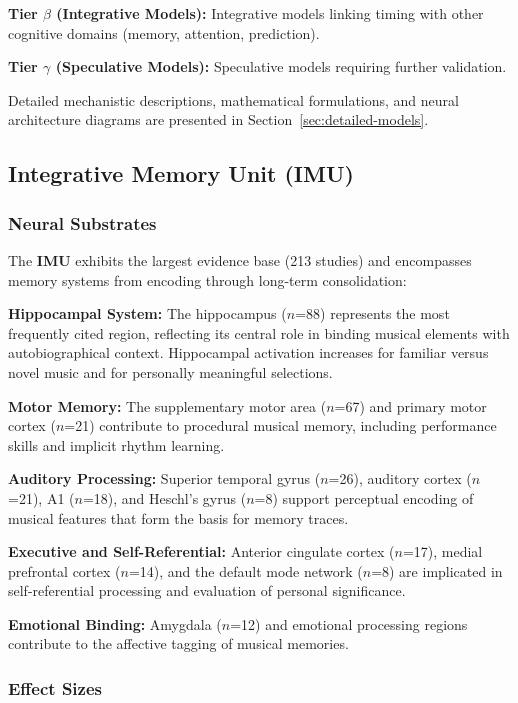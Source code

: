 \documentclass[9pt,onecolumn]{article}
\newcommand{\IMU}{\textcolor{imucolor}{\textbf{IMU}}}
\begin{document}
\textbf{Tier $\beta$ (Integrative Models):} Integrative models linking timing with other cognitive domains (memory, attention, prediction).

\textbf{Tier $\gamma$ (Speculative Models):} Speculative models requiring further validation.

Detailed mechanistic descriptions, mathematical formulations, and neural architecture diagrams are presented in Section~\ref{sec:detailed-models}.

\subsection{Integrative Memory Unit (\IMU{})}

\subsubsection{Neural Substrates}

The \IMU{} exhibits the largest evidence base (213 studies) and encompasses memory systems from encoding through long-term consolidation:

\textbf{Hippocampal System:} The hippocampus ($n$=88) represents the most frequently cited region, reflecting its central role in binding musical elements with autobiographical context. Hippocampal activation increases for familiar versus novel music and for personally meaningful selections.

\textbf{Motor Memory:} The supplementary motor area ($n$=67) and primary motor cortex ($n$=21) contribute to procedural musical memory, including performance skills and implicit rhythm learning.

\textbf{Auditory Processing:} Superior temporal gyrus ($n$=26), auditory cortex ($n$=21), A1 ($n$=18), and Heschl's gyrus ($n$=8) support perceptual encoding of musical features that form the basis for memory traces.

\textbf{Executive and Self-Referential:} Anterior cingulate cortex ($n$=17), medial prefrontal cortex ($n$=14), and the default mode network ($n$=8) are implicated in self-referential processing and evaluation of personal significance.

\textbf{Emotional Binding:} Amygdala ($n$=12) and emotional processing regions contribute to the affective tagging of musical memories.

\subsubsection{Effect Sizes}
\end{document}
